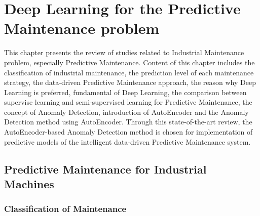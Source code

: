 
\chapter{Deep Learning for the Predictive Maintenance problem} %

\label{Chapter3} %




This chapter presents the review of studies related to Industrial Maintenance problem, especially Predictive Maintenance. Content of this chapter includes the classification of industrial maintenance, the prediction level of each maintenance strategy, the data-driven Predictive Maintenance approach, the reason why Deep Learning is preferred, fundamental of Deep Learning, the comparison between supervise learning and semi-supervised learning for Predictive Maintenance, the concept of Anomaly Detection, introduction of AutoEncoder and the Anomaly Detection method using AutoEncoder. Through this state-of-the-art review, the AutoEncoder-based Anomaly Detection method is chosen for implementation of predictive models of the intelligent data-driven Predictive Maintenance system.

\section{Predictive Maintenance for Industrial Machines}

\subsection{Classification of Maintenance}

